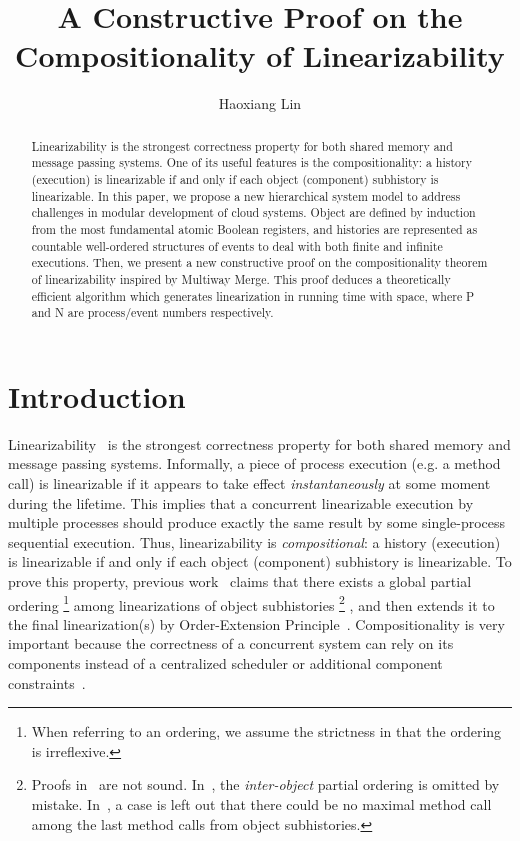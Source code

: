 \documentclass[a4paper,USenglish]{lipics-v2016}
\title{A Constructive Proof on the Compositionality of Linearizability}
\author[1]{Haoxiang Lin}
\affil[1]{
  Microsoft Research,
  Beijing, China\\
  \texttt{haoxlin@microsoft.com}
}
\newcommand{\lin}{linearizability}
\newcommand{\linb}{linearizable}
\newcommand{\Lin}{Linearizability}
\newcommand{\linz}{linearization}
\begin{document}
\maketitle


\begin{abstract}\label{sec:abs}	
	{\Lin} is the strongest correctness property for both shared memory and message passing systems.
	One of its useful features is the compositionality:
	a history (execution) is {\linb} if and only if each object (component) subhistory is {\linb}.
	In this paper, we propose a new hierarchical system model to address challenges in modular development of cloud systems.
	Object are defined by induction from the most fundamental atomic Boolean registers,
	and histories are represented as countable well-ordered structures of events
	to deal with both finite and infinite executions.
	Then, we present a new constructive proof on the
	compositionality theorem of {\lin} inspired by Multiway Merge.
	This proof deduces a theoretically efficient algorithm which generates {\linz}
	in  running time with  space,
	where P and N are process/event numbers respectively.
\end{abstract}

\newpage

\section{Introduction}\label{sec:intro}

{\Lin}~\cite{Herlihy90} is the strongest correctness property for both shared memory and message passing systems.
Informally, a piece of process execution (e.g. a method call)
is {\linb} if it appears to take effect \textit{instantaneously} at some moment during the lifetime.
This implies that a concurrent {\linb} execution by multiple processes
should produce exactly the same result by some single-process sequential execution.
Thus, {\lin} is \textit{compositional}: a history (execution) is {\linb} if and only if each object (component) subhistory is {\linb}.
To prove this property, previous work~\cite{Herlihy86, Herlihy87, Herlihy90, Herlihy08} claims that there exists a global partial ordering
\footnote
{
	When referring to an ordering, we assume the strictness in that the ordering is irreflexive.
}
among {\linz}s of object subhistories
\footnote
{
	Proofs in~\cite{Herlihy86, Herlihy87, Herlihy08} are not sound.
	In~\cite{Herlihy86, Herlihy87}, the \textit{inter-object} partial ordering is omitted by mistake.
	In~\cite{Herlihy08}, a case is left out that there could be no maximal method call among the last method calls from object subhistories.
}
, and then extends it to the final {\linz}(s) by Order-Extension Principle~\cite{Szpilrajn30}.
Compositionality is very important because the correctness of a concurrent system can rely on its components instead of a centralized scheduler or additional component constraints~\cite{Herlihy90, Herlihy08}.
\end{document}
